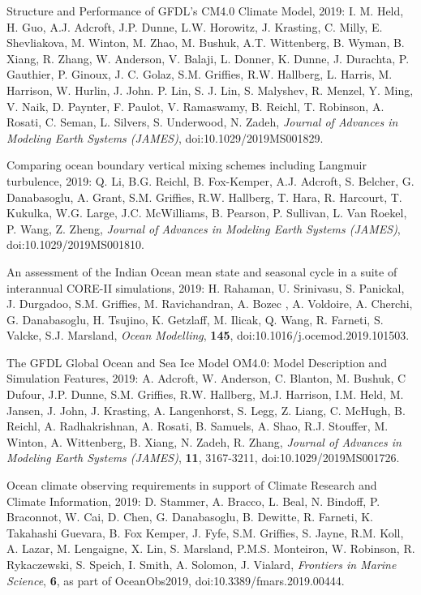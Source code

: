 \begin{etaremune}
\item Structure and Performance of GFDL's CM4.0 Climate Model, 2019: I. M. Held, H. Guo, A.J. Adcroft, J.P. Dunne, L.W. Horowitz, J. Krasting, C. Milly, E. Shevliakova, M. Winton, M. Zhao, M. Bushuk, A.T. Wittenberg, B. Wyman, B. Xiang, R. Zhang, W. Anderson, V. Balaji, L. Donner, K. Dunne, J. Durachta, P. Gauthier, P. Ginoux, J. C. Golaz, S.M. Griffies, R.W. Hallberg, L.  Harris, M. Harrison, W. Hurlin, J. John. P. Lin, S. J. Lin, S. Malyshev, R. Menzel, Y. Ming, V. Naik, D. Paynter, F. Paulot, V. Ramaswamy, B. Reichl, T. Robinson, A. Rosati, C. Seman, L. Silvers, S. Underwood, N. Zadeh, {\it Journal of Advances in Modeling Earth Systems (JAMES)}, doi:10.1029/2019MS001829.

\item Comparing ocean boundary vertical mixing schemes including Langmuir turbulence, 2019: Q. Li, B.G. Reichl,  B. Fox-Kemper, A.J. Adcroft, S. Belcher, G. Danabasoglu, A. Grant, S.M. Grif\/f\/ies, R.W. Hallberg, T. Hara, R. Harcourt, T. Kukulka, W.G. Large, J.C. McWilliams, B. Pearson, P. Sullivan, L. Van Roekel, P. Wang, Z. Zheng, {\it Journal of Advances in Modeling Earth Systems (JAMES)}, doi:10.1029/2019MS001810.

\item An assessment of the Indian Ocean mean state and seasonal cycle in a suite of interannual CORE-II simulations, 2019: H. Rahaman, U. Srinivasu,  S. Panickal, J. Durgadoo, S.M. Grif\/f\/ies, M. Ravichandran, A. Bozec , A. Voldoire, A. Cherchi, G. Danabasoglu, H. Tsujino, K. Getzlaff, M. Ilicak, Q. Wang, R. Farneti, S. Valcke, S.J. Marsland, {\it Ocean Modelling}, {\bf 145},  
doi:10.1016/j.ocemod.2019.101503.



\item The GFDL Global Ocean and Sea Ice Model OM4.0: Model Description and Simulation Features, 2019: A. Adcroft, W. Anderson, C. Blanton, M. Bushuk, C Dufour, J.P. Dunne, S.M. Grif\/f\/ies, R.W. Hallberg, M.J. Harrison, I.M. Held, M.  Jansen, J. John, J. Krasting, A. Langenhorst, S. Legg, Z. Liang, C. McHugh, B. Reichl, A. Radhakrishnan, A. Rosati, B. Samuels, A. Shao, R.J. Stouffer, M. Winton, A. Wittenberg, B. Xiang, N. Zadeh, R. Zhang, {\it Journal of Advances in Modeling Earth Systems (JAMES)},
{\bf 11}, 3167-3211, doi:10.1029/2019MS001726.

\item Ocean climate observing requirements in support of Climate Research and Climate Information, 2019: D. Stammer, A. Bracco, L. Beal, N. Bindoff, P. Braconnot, W. Cai, D. Chen, G. Danabasoglu, B. Dewitte, R. Farneti, K. Takahashi Guevara, B. Fox Kemper, J. Fyfe, S.M. Grif\/f\/ies, S. Jayne, R.M. Koll, A. Lazar, M. Lengaigne, X. Lin, S. Marsland, P.M.S. Monteiron, W. Robinson, R. Rykaczewski, S. Speich, I. Smith, A. Solomon, J. Vialard, {\it Frontiers in Marine Science}, {\bf 6}, as part of OceanObs2019, doi:10.3389/fmars.2019.00444.


\end{etaremune}
